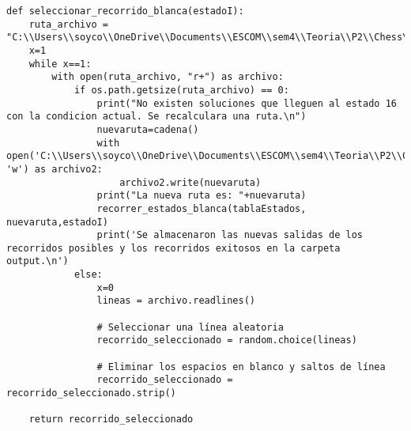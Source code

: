 \begin{lstlisting}
def seleccionar_recorrido_blanca(estadoI):
    ruta_archivo = "C:\\Users\\soyco\\OneDrive\\Documents\\ESCOM\\sem4\\Teoria\\P2\\Chess\\output\\recorridos_finales_blanca.txt"
    x=1
    while x==1:
        with open(ruta_archivo, "r+") as archivo:
            if os.path.getsize(ruta_archivo) == 0:
                print("No existen soluciones que lleguen al estado 16 con la condicion actual. Se recalculara una ruta.\n")
                nuevaruta=cadena()
                with open('C:\\Users\\soyco\\OneDrive\\Documents\\ESCOM\\sem4\\Teoria\\P2\\Chess\\output\\ruta_blanca.txt', 'w') as archivo2:
                    archivo2.write(nuevaruta)
                print("La nueva ruta es: "+nuevaruta)
                recorrer_estados_blanca(tablaEstados, nuevaruta,estadoI)
                print('Se almacenaron las nuevas salidas de los recorridos posibles y los recorridos exitosos en la carpeta output.\n')
            else:
                x=0  
                lineas = archivo.readlines()
                
                # Seleccionar una línea aleatoria
                recorrido_seleccionado = random.choice(lineas)
                
                # Eliminar los espacios en blanco y saltos de línea
                recorrido_seleccionado = recorrido_seleccionado.strip()
            
    return recorrido_seleccionado


\end{lstlisting}
